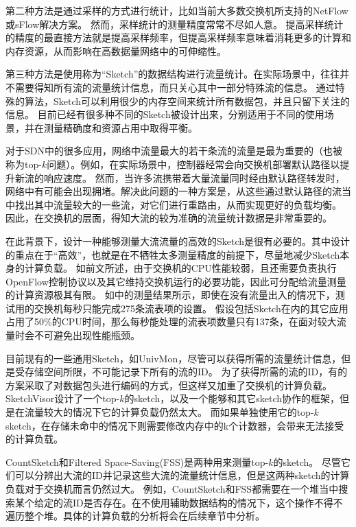 第二种方法是通过采样的方式进行统计，比如当前大多数交换机所支持的NetFlow\cite{estan2004building}或sFlow\cite{phaal2004sflow}解决方案。
然而，采样统计的测量精度常常不尽如人意\cite{yu2013software}\cite{li2016flowradar}。
提高采样统计的精度的最直接方法就是提高采样频率，但提高采样频率意味着消耗更多的计算和内存资源，从而影响在高数据量网络中的可伸缩性。

第三种方法是使用称为“Sketch”的数据结构进行流量统计。在实际场景中，往往并不需要得知所有流的流量统计信息，而只关心其中一部分特殊流的信息。
通过特殊的算法，Sketch可以利用很少的内存空间来统计所有数据包，并且只留下关注的信息。
目前已经有很多种不同的Sketch被设计出来，分别适用于不同的使用场景，并在测量精确度和资源占用中取得平衡\cite{KXW06}\cite{li2012per}\cite{estan2002new}。

对于SDN中的很多应用，网络中流量最大的若干条流的流量是最为重要的（也被称为top-$k$问题）。例如，在实际场景中，控制器经常会向交换机部署默认路径以提升新流的响应速度。
然而，当许多流携带着大量流量同时经由默认路径转发时，网络中有可能会出现拥堵。解决此问题的一种方案是，从这些通过默认路径的流当中找出其中流量较大的一些流，对它们进行重路由，从而实现更好的负载均衡。
因此，在交换机的层面，得知大流的较为准确的流量统计数据是非常重要的。

在此背景下，设计一种能够测量大流流量的高效的Sketch是很有必要的。其中设计的重点在于“高效”，也就是在不牺牲太多测量精度的前提下，尽量地减少Sketch本身的计算负载。
如前文所述，由于交换机的CPU性能较弱，且还需要负责执行OpenFlow控制协议以及其它维持交换机运行的必要功能，因此可分配给流量测量的计算资源极其有限。
如\cite{curtis2011devoflow}中的测量结果所示，即使在没有流量出入的情况下，测试用的交换机每秒只能完成275条流表项的设置。
假设包括Sketch在内的其它应用占用了50\%的CPU时间，那么每秒能处理的流表项数量只有137条，在面对较大流量时会不可避免出现性能瓶颈。

目前现有的一些通用Sketch，如UnivMon\cite{liu2016one}，尽管可以获得所需的流量统计信息，但是受存储空间所限，不可能记录下所有的流的ID。
为了获得所需的流的ID，有的方案采取了对数据包头进行编码的方式，但这样又加重了交换机的计算负载。
SketchVisor\cite{huang2017sketchvisor}设计了一个top-$k$的sketch，以及一个能够和其它sketch协作的框架，但是在流量较大的情况下它的计算负载仍然太大。
而如果单独使用它的top-$k$ sketch，在存储未命中的情况下则需要修改内存中的k个计数器，会带来无法接受的计算负载。

CountSketch\cite{charikar2004finding}和Filtered Space-Saving(FSS)\cite{homem2010finding}是两种用来测量top-$k$的sketch。
尽管它们可以分辨出大流的ID并记录这些大流的流量统计信息，但是这两种sketch的计算负载对于交换机而言仍然过大。
例如，CountSketch和FSS都需要在一个堆当中搜索某个给定的流ID是否存在。在不使用辅助数据结构的情况下，这个操作不得不遍历整个堆。具体的计算负载的分析将会在后续章节中分析。%

